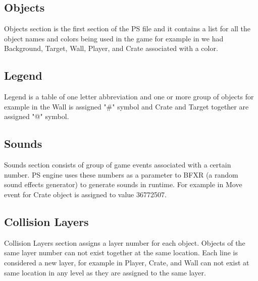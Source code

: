 \subsection{Objects}
Objects section is the first section of the PS file and it contains a list for all the object names and colors being used in the game for example in  we had Background, Target, Wall, Player, and Crate associated with a color.

\subsection{Legend}
Legend is a table of one letter abbreviation and one or more group of objects for example in  the Wall is assigned "\#" symbol and Crate and Target together are assigned "@" symbol.

\subsection{Sounds}
Sounds section consists of group of game events associated with a certain number. PS engine uses these numbers as a parameter to BFXR (a random sound effects generator) to generate sounds in runtime\cite{bfxr}. For example in  Move event for Crate object is assigned to value 36772507.

\subsection{Collision Layers}
Collision Layers section assigns a layer number for each object. Objects of the same layer number can not exist together at the same location. Each line is considered a new layer, for example in  Player, Crate, and Wall can not exist at same location in any level as they are assigned to the same layer.

